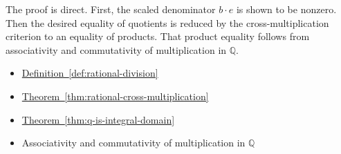 \begin{remark*}
The proof is direct. First, the scaled denominator $b\cdot e$ is shown
to be nonzero. Then the desired equality of quotients is reduced by the
cross-multiplication criterion to an equality of products. That product
equality follows from associativity and commutativity of multiplication
in $\mathbb{Q}$.
\end{remark*}

\begin{dependencies}
\begin{itemize}
  \item \hyperref[def:rational-division]{Definition~\ref*{def:rational-division}}
  \item \hyperref[thm:rational-cross-multiplication]{Theorem~\ref*{thm:rational-cross-multiplication}}
  \item \hyperref[thm:q-is-integral-domain]{Theorem~\ref*{thm:q-is-integral-domain}}
  \item Associativity and commutativity of multiplication in $\mathbb{Q}$
\end{itemize}
\end{dependencies}

